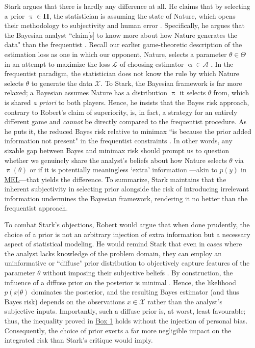\documentclass[letterpaper,12pt]{article}
\newcommand{\given}{|}
\begin{document}
Stark argues that there is hardly any difference at all. He claims that by selecting a prior $\uppi \in \boldsymbol{\Pi}$, the statistician is assuming the state of Nature, which opens their methodology to subjectivity and human error \cite{stark2020constraints}. Specifically, he argues that the Bayesian analyst ``claim[s] to know more about how Nature generates the data" than the frequentist \citep[p.8]{stark2020constraints}. Recall our earlier game-theoretic description of the estimation loss as one in which our opponent, Nature, selects a parameter $\theta \in \Theta$ in an attempt to maximize the loss $\mathcal{L}$ of choosing estimator $\upalpha \in \mathcal{A}$ \cite{ulansky2021}. In the frequentist paradigm, the statistician does not know the rule by which Nature selects $\theta$ to generate the data $\mathcal{X}$. To Stark, the Bayesian framework is far more relaxed; a Bayesian assumes Nature has a distribution $\uppi$ it selects $\theta$ from, which is shared \textit{a priori} to both players. Hence, he insists that the Bayes risk approach, contrary to Robert's claim of superiority, is, in fact, a strategy for an entirely different game and \textit{cannot} be directly compared to the frequentist procedure. As he puts it, the reduced Bayes risk relative to minimax ``is because the prior added information not present" in the frequentist constraints \citep[p.10]{stark2020constraints}. In other words, any sizable gap between Bayes and minimax risk should prompt us to question whether we genuinely share the analyst's beliefs about how Nature selects $\theta$ via $\uppi(\theta)$ or if it is potentially meaningless `extra' information —akin to $p(y)$ in \hyperref[eq:MEL]{MEL}—that yields the difference. To summarize, Stark maintains that the inherent subjectivity in selecting prior alongside the risk of introducing irrelevant information undermines the Bayesian framework, rendering it no better than the frequentist approach.  

To combat Stark's objections, Robert would argue that when done prudently, the choice of a prior is not an arbitrary injection of extra information but a necessary aspect of statistical modeling. He would remind Stark that even in cases where the analyst lacks knowledge of the problem domain, they can employ an uninformative or ``diffuse" prior distribution to objectively capture features of the parameter $\theta$ without imposing their subjective beliefs \cite{zellner1971}. By construction, the influence of a diffuse prior on the posterior is minimal \cite{lee2025}. Hence, the likelihood $p(x \given \theta)$ dominates the posterior, and the resulting Bayes estimator (and thus Bayes risk) depends on the observations $x \in \mathcal{X}$ rather than the analyst's subjective inputs. Importantly, such a diffuse prior is, at worst, least favourable; thus, the inequality proved in \hyperref[proof:box1]{Box 1} holds without the injection of personal bias. Consequently, the choice of prior exerts a far more negligible impact on the integrated risk than Stark's critique would imply. 
\end{document}
